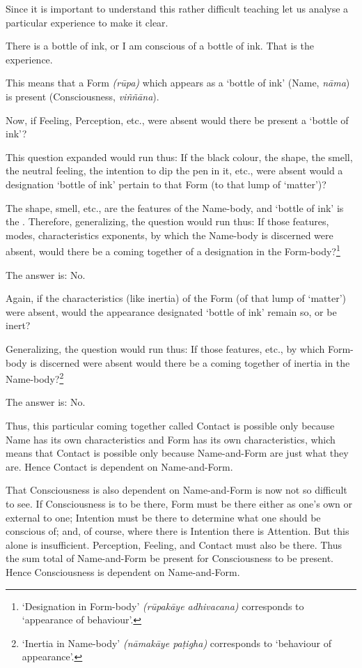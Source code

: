 Since it is important to understand this rather difficult teaching let us analyse a particular experience to make it clear.

There is a bottle of ink, or I am conscious of a bottle of ink. That is the experience.

This means that a Form \emph{(rūpa)} which appears as a `bottle of ink' (Name, \emph{nāma}) is present (Consciousness, \emph{viññāna}).

Now, if Feeling, Perception, etc., were absent would there be present a `bottle of ink'?

This question expanded would run thus: If the black colour, the shape, the smell, the neutral feeling, the intention to dip the pen in it, etc., were absent would a designation `bottle of ink' pertain to that Form (to that lump of `matter')?

The shape, smell, etc., are the features of the Name-body, and `bottle of ink' is the . Therefore, generalizing, the question would run thus: If those features, modes, characteristics exponents, by which the Name-body is discerned were absent, would there be a coming together of a designation in the Form-body?\footnote{`Designation in Form-body' \emph{(rūpakāye adhivacana)} corresponds to `appearance of behaviour'.}

The answer is: No.

Again, if the characteristics (like inertia) of the Form (of that lump of `matter') were absent, would the appearance designated `bottle of ink' remain so, or be inert?

Generalizing, the question would run thus: If those features, etc., by which Form-body is discerned were absent would there be a coming together of inertia in the Name-body?\footnote{`Inertia in Name-body' \emph{(nāmakāye paṭigha)} corresponds to `behaviour of appearance'.}

The answer is: No.

Thus, this particular coming together called Contact is possible only because Name has its own characteristics and Form has its own characteristics, which means that Contact is possible only because Name-and-Form are just what they are. Hence Contact is dependent on Name-and-Form.

That Consciousness is also dependent on Name-and-Form is now not so difficult to see. If Consciousness is to be there, Form must be there either as one's own or external to one; Intention must be there to determine what one should be conscious of; and, of course, where there is Intention there is Attention. But this alone is insufficient. Perception, Feeling, and Contact must also be there. Thus the sum total of Name-and-Form  be present for Consciousness to be present. Hence Consciousness is dependent on Name-and-Form.

